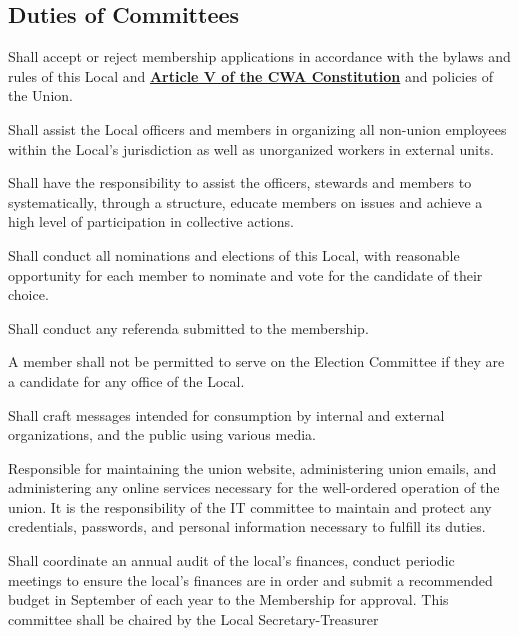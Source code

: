 \documentclass[11pt]{article}
\let\oldhref\href
\renewcommand{\href}[2]{\oldhref{#1}{\bfseries#2}}
\newcommand{\articlesection}[1]{\vspace{.25cm}\subsection{#1}}
\begin{document}
\articlesection{Duties of Committees}\label{duties-of-committees}
\begin{description}[labelwidth=\linewidth, listparindent=0pt]
\item[Membership Committee]
Shall accept or reject membership applications in accordance with the bylaws and rules of this Local and \href{https://cwa-union.org/for-locals/cwa-constitution\#A5}{Article V of the CWA Constitution} and policies of the Union.

\item[Organizing Committee]
Shall assist the Local officers and members in organizing all non-union employees within the Local's jurisdiction as well as unorganized workers in external units.

\item[Mobilization Committee]
Shall have the responsibility to assist the officers, stewards and members to systematically, through a structure, educate members on issues and achieve a high level of participation in collective actions.

\item[Election Committee]
Shall conduct all nominations and elections of this Local, with reasonable opportunity for each member to nominate and vote for the candidate of their choice.

Shall conduct any referenda submitted to the membership.

A member shall not be permitted to serve on the Election Committee if they are a candidate for any office of the Local.


\item[Communications Committee]
Shall craft messages intended for consumption by internal and external organizations, and the public using various media.

\item[IT Committee]
Responsible for maintaining the union website, administering union emails, and administering any online services necessary for the well-ordered operation of the union. It is the responsibility of the IT committee to maintain and protect any credentials, passwords, and personal information necessary to fulfill its duties.

\item[Finance Committee]
Shall coordinate an annual audit of the local’s finances, conduct periodic meetings to ensure the local’s finances are in order and submit a recommended budget in September of each year to the Membership for approval. This committee shall be chaired by the Local Secretary-Treasurer


\end{description}
\end{document}
